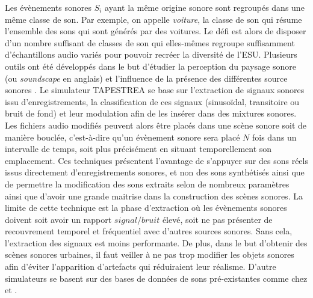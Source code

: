 Les évènements sonores $S_i$ ayant la même origine sonore sont regroupés dans une même classe de son. Par exemple, on appelle \textit{voiture}, la classe de son qui résume l'ensemble des sons qui sont générés par des voitures. 
Le défi est alors de disposer d'un nombre suffisant de classes de son qui elles-mêmes regroupe suffisamment d'échantillons audio variés pour pouvoir recréer la diversité de l'ESU. Plusieurs outils ont été développés dans le but d'étudier la perception du paysage sonore (ou \textit{soundscape} en anglais) et l'influence de la présence des différentes source sonores \cite{valle2009framework, finney2010soundscape}. Le simulateur TAPESTREA \cite{misra_musical_2007} se base sur l'extraction de signaux sonores issu d'enregistrements, la classification de ces signaux (sinusoïdal, transitoire ou bruit de fond) et leur modulation afin de les insérer dans des mixtures sonores. Les fichiers audio modifiés peuvent alors être placés dans une scène sonore soit de manière bouclée, c'est-à-dire qu'un évènement sonore sera placé $N$ fois dans un intervalle de temps, soit plus précisément en situant temporellement son emplacement.
Ces techniques présentent l'avantage de s'appuyer sur des sons réels issus directement d'enregistrements sonores, et non des sons synthétisés ainsi que de permettre la modification des sons extraits selon de nombreux paramètres ainsi que d'avoir une grande maitrise dans la construction des scènes sonores. La limite de cette technique est la phase d'extraction où les évènements sonores doivent soit avoir un rapport $signal/bruit$ élevé, soit ne pas présenter de recouvrement temporel et fréquentiel avec d'autres sources sonores. Sans cela, l'extraction des signaux est moins performante. De plus, dans le but d'obtenir des scènes sonores urbaines, il faut veiller à ne pas trop modifier les objets sonores afin d'éviter l'apparition d'artefacts qui réduiraient leur réalisme.
D'autre simulateurs se basent sur des bases de données de sons pré-existantes comme chez \cite{bruce_development_2009} et \cite{rossignol_simscene_2015}.

